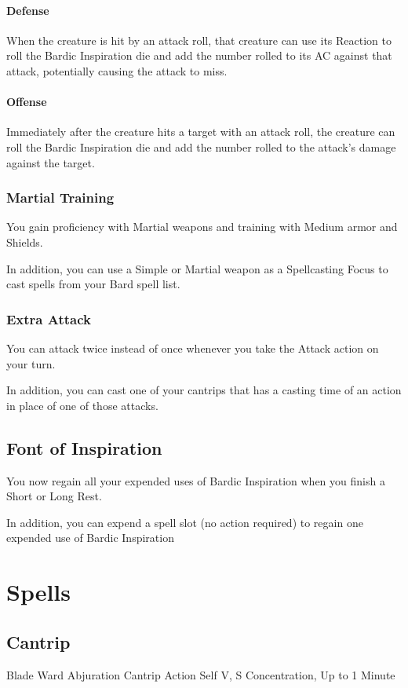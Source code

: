 \documentclass[letterpaper,openany,oneside,twocolumn]{book}
\begin{document}
\paragraph*{Defense} When the creature is hit by an attack roll, that creature can use its Reaction to roll the Bardic Inspiration die and add the number rolled to its AC against that attack, potentially causing the attack to miss.
\paragraph*{Offense} Immediately after the creature hits a target with an attack roll, the creature can roll the Bardic Inspiration die and add the number rolled to the attack's damage against the target.
\subsubsection*{Martial Training}
You gain proficiency with Martial weapons and training with Medium armor and Shields.

In addition, you can use a Simple or Martial weapon as a Spellcasting Focus to cast spells from your Bard spell list.
\subsubsection*{Extra Attack}
You can attack twice instead of once whenever you take the Attack action on your turn.

In addition, you can cast one of your cantrips that has a casting time of an action in place of one of those attacks.

\subsection*{Font of Inspiration}
You now regain all your expended uses of Bardic Inspiration when you finish a Short or Long Rest.

In addition, you can expend a spell slot (no action required) to regain one expended use of Bardic Inspiration

\section*{Spells}
\subsection*{Cantrip}

\DndSpellHeader
  {Blade Ward}
  {Abjuration Cantrip}
  {Action}
  {Self}
  {V, S}
  {Concentration, Up to 1 Minute}
\end{document}
